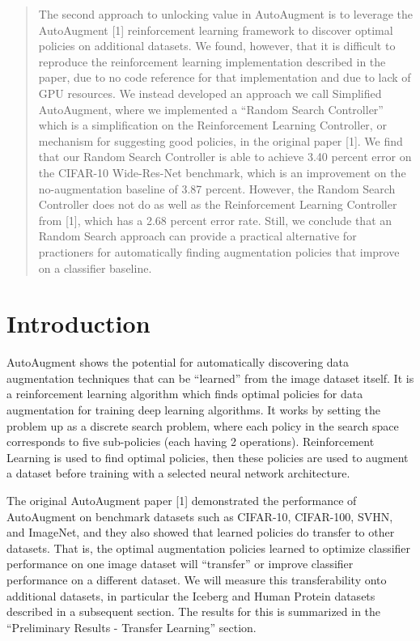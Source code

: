 \documentclass[10pt,twocolumn,letterpaper]{article}
\begin{document}
\begin{abstract}
The second approach to unlocking value in AutoAugment is to leverage the AutoAugment [1] reinforcement learning framework to discover optimal policies on additional datasets.  We found, however, that it is difficult to reproduce the reinforcement learning implementation described in the paper, due to no code reference for that implementation and due to lack of GPU resources.  We instead developed an approach we call Simplified AutoAugment, where we implemented a “Random Search Controller” which is a simplification on the Reinforcement Learning Controller, or mechanism for suggesting good policies, in the original paper [1].  We find that our Random Search Controller is able to achieve 3.40 percent error on the CIFAR-10 Wide-Res-Net benchmark, which is an improvement on the no-augmentation baseline of 3.87 percent.  However, the Random Search Controller does not do as well as the Reinforcement Learning Controller from [1], which has a 2.68 percent error rate.  Still, we conclude that an Random Search approach can provide a practical alternative for practioners for automatically finding augmentation policies that improve on a classifier baseline.

\end{abstract}

\section{Introduction}

AutoAugment shows the potential for automatically discovering data augmentation techniques that can be “learned” from the image dataset itself. It is a reinforcement learning algorithm which finds optimal policies for data augmentation for training deep learning algorithms. It works by setting the problem up as a discrete search problem, where each policy in the search space corresponds to five sub-policies (each having 2 operations). Reinforcement Learning is used to find optimal policies, then these policies are used to augment a dataset before training with a selected neural network architecture.

The original AutoAugment paper [1] demonstrated the performance of AutoAugment on benchmark datasets such as CIFAR-10, CIFAR-100, SVHN, and ImageNet, and they also showed that learned policies do transfer to other datasets.   That is, the optimal augmentation policies learned to optimize classifier performance on one image dataset will “transfer” or improve classifier performance on a different dataset.   We will measure this transferability onto additional datasets, in particular the Iceberg and Human Protein datasets described in a subsequent section.  The results for this is summarized in the “Preliminary Results - Transfer Learning” section.
\end{document}
